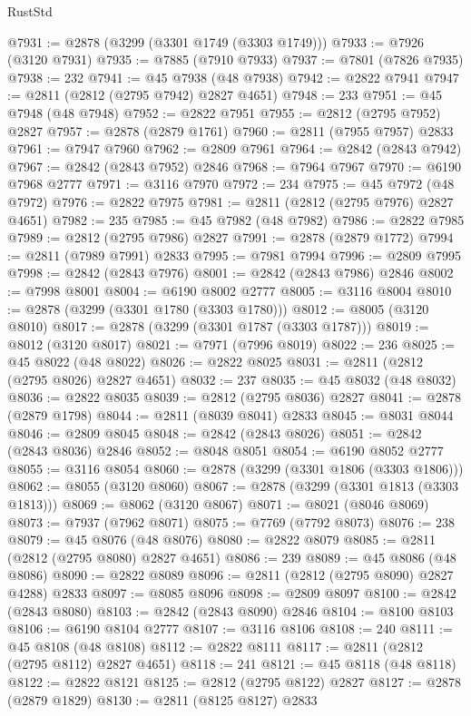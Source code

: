 \begin{lexlean}{RustStd}
\begin{coremodule}
{\begin{coremodule}
{{{{{{{{{{{{{{{{{{{{{{{{{{{{{{{{{@7931 := @2878 (@3299 (@3301 @1749 (@3303 @1749)))
@7933 := @7926 (@3120 @7931)
@7935 := @7885 (@7910 @7933)
@7937 := @7801 (@7826 @7935)
@7938 := 232
@7941 := @45 @7938 (@48 @7938)
@7942 := @2822 @7941
@7947 := @2811 (@2812 (@2795 @7942) @2827 @4651)
@7948 := 233
@7951 := @45 @7948 (@48 @7948)
@7952 := @2822 @7951
@7955 := @2812 (@2795 @7952) @2827
@7957 := @2878 (@2879 @1761)
@7960 := @2811 (@7955 @7957) @2833
@7961 := @7947 @7960
@7962 := @2809 @7961
@7964 := @2842 (@2843 @7942)
@7967 := @2842 (@2843 @7952) @2846
@7968 := @7964 @7967
@7970 := @6190 @7968 @2777
@7971 := @3116 @7970
@7972 := 234
@7975 := @45 @7972 (@48 @7972)
@7976 := @2822 @7975
@7981 := @2811 (@2812 (@2795 @7976) @2827 @4651)
@7982 := 235
@7985 := @45 @7982 (@48 @7982)
@7986 := @2822 @7985
@7989 := @2812 (@2795 @7986) @2827
@7991 := @2878 (@2879 @1772)
@7994 := @2811 (@7989 @7991) @2833
@7995 := @7981 @7994
@7996 := @2809 @7995
@7998 := @2842 (@2843 @7976)
@8001 := @2842 (@2843 @7986) @2846
@8002 := @7998 @8001
@8004 := @6190 @8002 @2777
@8005 := @3116 @8004
@8010 := @2878 (@3299 (@3301 @1780 (@3303 @1780)))
@8012 := @8005 (@3120 @8010)
@8017 := @2878 (@3299 (@3301 @1787 (@3303 @1787)))
@8019 := @8012 (@3120 @8017)
@8021 := @7971 (@7996 @8019)
@8022 := 236
@8025 := @45 @8022 (@48 @8022)
@8026 := @2822 @8025
@8031 := @2811 (@2812 (@2795 @8026) @2827 @4651)
@8032 := 237
@8035 := @45 @8032 (@48 @8032)
@8036 := @2822 @8035
@8039 := @2812 (@2795 @8036) @2827
@8041 := @2878 (@2879 @1798)
@8044 := @2811 (@8039 @8041) @2833
@8045 := @8031 @8044
@8046 := @2809 @8045
@8048 := @2842 (@2843 @8026)
@8051 := @2842 (@2843 @8036) @2846
@8052 := @8048 @8051
@8054 := @6190 @8052 @2777
@8055 := @3116 @8054
@8060 := @2878 (@3299 (@3301 @1806 (@3303 @1806)))
@8062 := @8055 (@3120 @8060)
@8067 := @2878 (@3299 (@3301 @1813 (@3303 @1813)))
@8069 := @8062 (@3120 @8067)
@8071 := @8021 (@8046 @8069)
@8073 := @7937 (@7962 @8071)
@8075 := @7769 (@7792 @8073)
@8076 := 238
@8079 := @45 @8076 (@48 @8076)
@8080 := @2822 @8079
@8085 := @2811 (@2812 (@2795 @8080) @2827 @4651)
@8086 := 239
@8089 := @45 @8086 (@48 @8086)
@8090 := @2822 @8089
@8096 := @2811 (@2812 (@2795 @8090) @2827 @4288) @2833
@8097 := @8085 @8096
@8098 := @2809 @8097
@8100 := @2842 (@2843 @8080)
@8103 := @2842 (@2843 @8090) @2846
@8104 := @8100 @8103
@8106 := @6190 @8104 @2777
@8107 := @3116 @8106
@8108 := 240
@8111 := @45 @8108 (@48 @8108)
@8112 := @2822 @8111
@8117 := @2811 (@2812 (@2795 @8112) @2827 @4651)
@8118 := 241
@8121 := @45 @8118 (@48 @8118)
@8122 := @2822 @8121
@8125 := @2812 (@2795 @8122) @2827
@8127 := @2878 (@2879 @1829)
@8130 := @2811 (@8125 @8127) @2833
}}}}}}}}}}}}}}}}}}}}}}}}}}}}}}}}}
\end{coremodule}}
\end{coremodule}
\end{lexlean}

